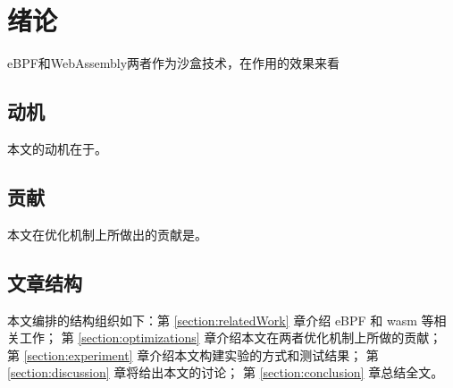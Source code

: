 \section{绪论}
    eBPF和WebAssembly两者作为沙盒技术，在作用的效果来看
\subsection{动机}
    本文的动机在于。
\subsection{贡献}
    本文在优化机制上所做出的贡献是。
\subsection{文章结构}
    本文编排的结构组织如下：第 \ref{section:relatedWork} 章介绍 eBPF 和 wasm 等相关工作；
    第 \ref{section:optimizations} 章介绍本文在两者优化机制上所做的贡献；
    第 \ref{section:experiment} 章介绍本文构建实验的方式和测试结果；
    第 \ref{section:discussion} 章将给出本文的讨论；
    第 \ref{section:conclusion} 章总结全文。
